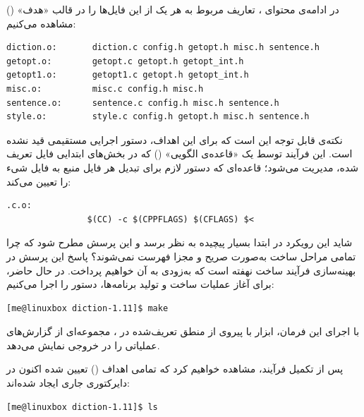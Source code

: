 در ادامه‌ی محتوای ، تعاریف مربوط به هر یک از این فایل‌ها را در قالب «هدف» () مشاهده می‌کنیم:

\begin{latin}
\begin{lstlisting}
diction.o:       diction.c config.h getopt.h misc.h sentence.h
getopt.o:        getopt.c getopt.h getopt_int.h
getopt1.o:       getopt1.c getopt.h getopt_int.h
misc.o:          misc.c config.h misc.h
sentence.o:      sentence.c config.h misc.h sentence.h
style.o:         style.c config.h getopt.h misc.h sentence.h
\end{lstlisting}
\end{latin}

نکته‌ی قابل توجه این است که برای این اهداف، دستور اجرایی مستقیمی قید نشده است. این فرآیند توسط یک «قاعده‌ی الگویی» () که در بخش‌های ابتدایی فایل تعریف شده، مدیریت می‌شود؛ قاعده‌ای که دستور لازم برای تبدیل هر فایل منبع  به فایل شیء  را تعیین می‌کند:

\begin{latin}
\begin{lstlisting}
.c.o:
            	$(CC) -c $(CPPFLAGS) $(CFLAGS) $<
\end{lstlisting}
\end{latin}

شاید این رویکرد در ابتدا بسیار پیچیده به نظر برسد و این پرسش مطرح شود که چرا تمامی مراحل ساخت به‌صورت صریح و مجزا فهرست نمی‌شوند؟ پاسخ این پرسش در بهینه‌سازی فرآیند ساخت نهفته است که به‌زودی به آن خواهیم پرداخت. در حال حاضر، برای آغاز عملیات ساخت و تولید برنامه‌ها، دستور  را اجرا می‌کنیم:

\begin{latin}
\begin{lstlisting}
[me@linuxbox diction-1.11]$ make
\end{lstlisting}
\end{latin}

با اجرای این فرمان، ابزار  با پیروی از منطق تعریف‌شده در ، مجموعه‌ای از گزارش‌های عملیاتی را در خروجی نمایش می‌دهد.

پس از تکمیل فرآیند، مشاهده خواهیم کرد که تمامی اهداف () تعیین شده اکنون در دایرکتوری جاری ایجاد شده‌اند:

\begin{latin}
\begin{lstlisting}
[me@linuxbox diction-1.11]$ ls
\end{lstlisting}
\end{latin}

